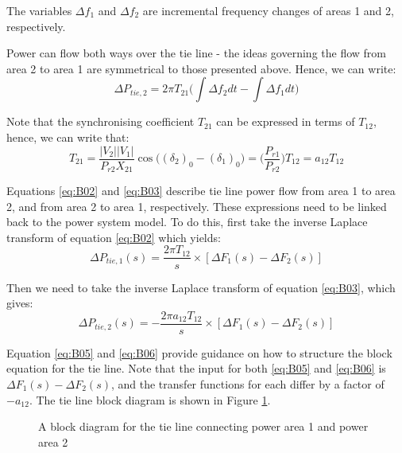 The variables $\Delta f_1$ and $\Delta f_2$ are incremental frequency changes of areas 1 and 2, respectively.

Power can flow both ways over the tie line - the ideas governing the flow from area 2 to area 1 are symmetrical to those presented above. Hence, we can write:
\begin{equation}
	\Delta P_{tie, 2} = 2 \pi T_{21} \bigg( \int \Delta f_2 dt - \int \Delta f_1 dt \bigg) \label{eq:B03}
\end{equation}

Note that the synchronising coefficient $T_{21}$ can be expressed in terms of $T_{12}$, hence, we can write that:
\begin{equation}
	T_{21} = \frac{|V_2||V_1|}{P_{r2} X_{21}} \cos \big( (\delta_2)_0 - (\delta_1)_0 \big) = \bigg( \frac{P_{r1}}{P_{r2}} \bigg) T_{12} = a_{12} T_{12} \label{eq:B04}
\end{equation}

Equations \ref{eq:B02} and \ref{eq:B03} describe tie line power flow from area 1 to area 2, and from area 2 to area 1, respectively. These expressions need to be linked back to the power system model. To do this, first take the inverse Laplace transform of equation \ref{eq:B02} which yields:
\begin{equation}
	\Delta P_{tie,1}(s) = \frac{2 \pi T_{12}}{s} \times [\Delta F_1(s) - \Delta F_2(s)] \label{eq:B05}
\end{equation}

Then we need to take the inverse Laplace transform of equation \ref{eq:B03}, which gives:
\begin{equation}
	\Delta P_{tie,2}(s) = - \frac{2 \pi a_{12} T_{12}}{s} \times [\Delta F_1(s) - \Delta F_2(s)] \label{eq:B06}
\end{equation}

Equation \ref{eq:B05} and \ref{eq:B06} provide guidance on how to structure the block equation for the tie line. Note that the input for both \ref{eq:B05} and \ref{eq:B06} is $\Delta F_1(s) - \Delta F_2(s)$, and the transfer functions for each differ by a factor of $-a_{12}$. The tie line block diagram is shown in Figure \ref{fig:B101_tie_line_model}.

\begin{figure}[h]
	\centering
	
	\caption[Tie line model]{A block diagram for the tie line connecting power area 1 and power area 2}
	\label{fig:B101_tie_line_model}
\end{figure}